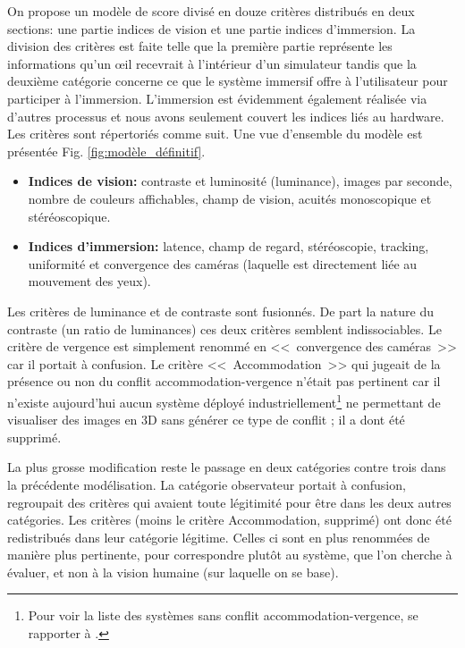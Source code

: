 	\par On propose un modèle de score divisé en douze critères distribués en deux sections: une partie indices de vision et une partie indices d'immersion. La division des critères est faite telle que la première partie représente les informations qu'un œil recevrait à l'intérieur d'un simulateur tandis que la deuxième catégorie concerne ce que le système immersif offre à l'utilisateur pour participer à l'immersion. L'immersion est évidemment également réalisée via d'autres processus et nous avons seulement couvert les indices liés au hardware. Les critères sont répertoriés comme suit. Une vue d'ensemble du modèle est présentée Fig. \ref{fig:modèle_définitif}.
	
	\begin{itemize}\itemsep12pt
		\item \textbf{Indices de vision:} contraste et luminosité (luminance), images par seconde, nombre de couleurs affichables, champ de vision, acuités monoscopique et stéréoscopique.
		\item \textbf{Indices d'immersion:} latence, champ de regard, stéréoscopie, tracking, uniformité et convergence des caméras (laquelle est directement liée au mouvement des yeux).
	\end{itemize}
	
	\par Les critères de luminance et de contraste sont fusionnés. De part la nature du contraste (un ratio de luminances) ces deux critères semblent indissociables. Le critère de vergence est simplement renommé en <<~convergence des caméras~>> car il portait à confusion. Le critère <<~Accommodation~>> qui jugeait de la présence ou non du conflit accommodation-vergence n'était pas pertinent car il n'existe aujourd'hui aucun système déployé industriellement\footnote{Pour voir la liste des systèmes sans conflit accommodation-vergence, se rapporter à \citep{mehrabi_making_2013}.} ne permettant de visualiser des images en 3D sans générer ce type de conflit ; il a dont été supprimé.
	
	\par La plus grosse modification reste le passage en deux catégories contre trois dans la précédente modélisation. La catégorie observateur portait à confusion, regroupait des critères qui avaient toute légitimité pour être dans les deux autres catégories. Les critères (moins le critère Accommodation, supprimé) ont donc été redistribués dans leur catégorie légitime. Celles ci sont en plus renommées de manière plus pertinente, pour correspondre plutôt au système, que l'on cherche à évaluer, et non à la vision humaine (sur laquelle on se base).
	
